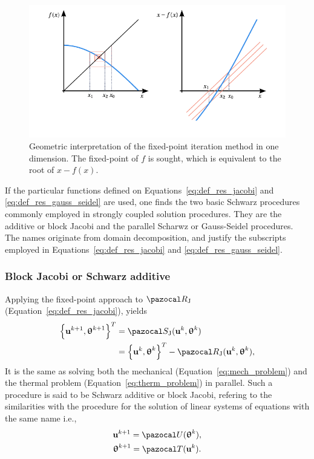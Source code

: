 \begin{figure}
  \includegraphics{figures/fixed_point_iteration}
  \caption{Geometric interpretation of the fixed-point iteration method in one dimension. The fixed-point of \(f\) is sought, which is equivalent to the root of \(x-f(x)\).}
  \label{fig:fixed_point_iteration}
\end{figure}

If the particular functions defined on Equations~\eqref{eq:def_res_jacobi} and \eqref{eq:def_res_gauss_seidel} are used, one finds the  two basic Schwarz procedures commonly employed in strongly coupled solution procedures.
They are the additive or block Jacobi and the parallel Scharwz or Gauss-Seidel procedures.
The names originate from domain decomposition, and justify the subscripts employed in Equations~\eqref{eq:def_res_jacobi} and \eqref{eq:def_res_gauss_seidel}.

\subsubsection{Block Jacobi or Schwarz additive}

Applying the fixed-point approach to \(\pazocal R_\mathrm{J}\) (Equation~\eqref{eq:def_res_jacobi}), yields
\begin{align}
  \left\{\mathbf u^{k+1}, \bm\uptheta^{k+1}\right\}^T &= \pazocal S_\mathrm{J}(\mathbf u^k, \bm\uptheta^k)\\
   &= \left\{\mathbf u^k, \bm\uptheta^k\right\}^T - \pazocal R_\mathrm{J}(\mathbf u^k, \bm \uptheta^k),
\end{align}
It is the same as solving both the mechanical (Equation~\eqref{eq:mech_problem}) and the thermal problem (Equation~\eqref{eq:therm_problem}) in parallel.
Such a procedure is said to be Schwarz additive or block Jacobi, refering to the similarities with the procedure for the solution of linear systems of equations with the same name i.e.,
\begin{gather}
\mathbf u^{k+1} = \pazocal U(\bm \uptheta^k),\\
\bm \uptheta^{k+1} = \pazocal T(\mathbf u^k).
\end{gather}

